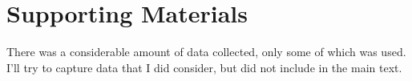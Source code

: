 \chapter{Supporting Materials}

There was a considerable amount of data collected, only some of which was used.  I'll try to capture
data that I did consider, but did not include in the main text.


